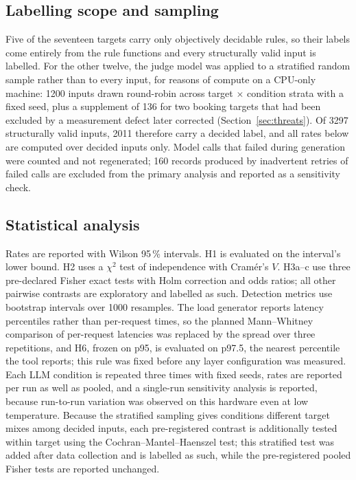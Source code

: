 \documentclass[conference]{IEEEtran}
\begin{document}
\subsection{Labelling scope and sampling}
Five of the seventeen targets carry only objectively decidable rules, so their labels come entirely
from the rule functions and every structurally valid input is labelled. For the other twelve, the
judge model was applied to a stratified random sample rather than to every input, for reasons of
compute on a CPU-only machine: 1200 inputs drawn round-robin across target $\times$ condition strata
with a fixed seed, plus a supplement of 136 for two booking targets that had been excluded by a
measurement defect later corrected (Section~\ref{sec:threats}). Of 3297 structurally valid inputs,
2011 therefore carry a decided label, and all rates below are computed over decided inputs only.
Model calls that failed during generation were counted and not regenerated; 160 records produced by
inadvertent retries of failed calls are excluded from the primary analysis and reported as a
sensitivity check.

\subsection{Statistical analysis}
Rates are reported with Wilson 95\,\% intervals. H1 is evaluated on the interval's lower bound. H2
uses a $\chi^2$ test of independence with Cram\'er's $V$. H3a--c use three pre-declared Fisher exact
tests with Holm correction and odds ratios; all other pairwise contrasts are exploratory and labelled
as such. Detection metrics use bootstrap intervals over 1000 resamples. The load generator reports
latency percentiles rather than per-request times, so the planned Mann--Whitney comparison of
per-request latencies was replaced by the spread over three repetitions, and H6, frozen on p95, is
evaluated on p97.5, the nearest percentile the tool reports; this rule was fixed before any layer
configuration was measured. Each LLM condition is repeated three times
with fixed seeds, rates are reported per run as well as pooled, and a single-run sensitivity analysis
is reported, because run-to-run variation was observed on this hardware even at low temperature.
Because the stratified sampling gives conditions different target mixes among decided inputs, each
pre-registered contrast is additionally tested within target using the Cochran--Mantel--Haenszel
test; this stratified test was added after data collection and is labelled as such, while the
pre-registered pooled Fisher tests are reported unchanged.
\end{document}
